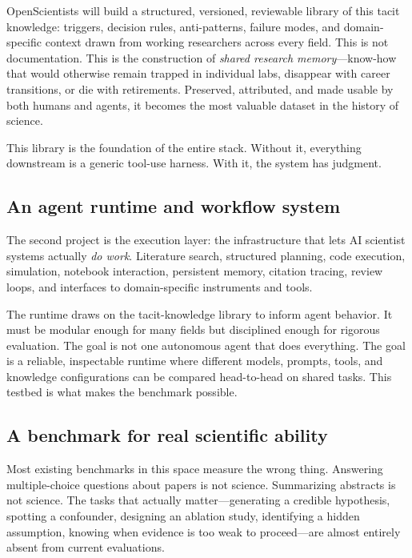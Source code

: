 \documentclass[11pt]{article}
\begin{document}
OpenScientists will build a structured, versioned, reviewable library of this tacit knowledge: triggers, decision rules, anti-patterns, failure modes, and domain-specific context drawn from working researchers across every field. This is not documentation. This is the construction of \emph{shared research memory}---know-how that would otherwise remain trapped in individual labs, disappear with career transitions, or die with retirements. Preserved, attributed, and made usable by both humans and agents, it becomes the most valuable dataset in the history of science.

This library is the foundation of the entire stack. Without it, everything downstream is a generic tool-use harness. With it, the system has judgment.

\subsection{An agent runtime and workflow system}

The second project is the execution layer: the infrastructure that lets AI scientist systems actually \emph{do work}. Literature search, structured planning, code execution, simulation, notebook interaction, persistent memory, citation tracing, review loops, and interfaces to domain-specific instruments and tools.

The runtime draws on the tacit-knowledge library to inform agent behavior. It must be modular enough for many fields but disciplined enough for rigorous evaluation. The goal is not one autonomous agent that does everything. The goal is a reliable, inspectable runtime where different models, prompts, tools, and knowledge configurations can be compared head-to-head on shared tasks. This testbed is what makes the benchmark possible.

\subsection{A benchmark for real scientific ability}

Most existing benchmarks in this space measure the wrong thing. Answering multiple-choice questions about papers is not science. Summarizing abstracts is not science. The tasks that actually matter---generating a credible hypothesis, spotting a confounder, designing an ablation study, identifying a hidden assumption, knowing when evidence is too weak to proceed---are almost entirely absent from current evaluations.
\end{document}

